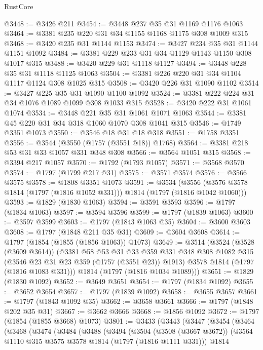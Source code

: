 \begin{lexlean}{RustCore}
\begin{coremodule}
@3448 := @3426 @211
@3454 := @3448 @237 @35 @31 @1169 @1176 @1063
@3464 := @3381 @235 @220 @31 @34 @1155 @1168 @1175 @308 @1009 @315
@3468 := @3420 @235 @31 @1144 @1153
@3474 := @3427 @234 @35 @31 @1144 @1151 @1092
@3484 := @3381 @229 @233 @31 @34 @1129 @1143 @1150 @308 @1017 @315
@3488 := @3420 @229 @31 @1118 @1127
@3494 := @3448 @228 @35 @31 @1118 @1125 @1063
@3504 := @3381 @226 @220 @31 @34 @1104 @1117 @1124 @308 @1025 @315
@3508 := @3420 @226 @31 @1090 @1102
@3514 := @3427 @225 @35 @31 @1090 @1100 @1092
@3524 := @3381 @222 @224 @31 @34 @1076 @1089 @1099 @308 @1033 @315
@3528 := @3420 @222 @31 @1061 @1074
@3534 := @3448 @221 @35 @31 @1061 @1071 @1063
@3544 := @3381 @45 @220 @31 @34 @318 @1060 @1070 @308 @1041 @315
@3546 := @1749 @3351 @1073
@3550 := @3546 @18 @31 @18 @318
@3551 := @1758 @3351
@3556 := @3544 (@3550 (@1757 (@3551 @18)) @1768)
@3564 := @3381 @218 @53 @31 @33 @1057 @331 @348 @308
@3566 := @3564 @1051 @315
@3568 := @3394 @217 @1057
@3570 := @1792 (@1793 @1057)
@3571 := @3568 @3570
@3574 := @1797 (@1799 @217 @31)
@3575 := @3571 @3574
@3576 := @3566 @3575
@3578 := @1808 @3351 @1073
@3591 := @3534
    (@3556 (@3576 @3578 @1814 (@1797 (@1816 @1052 @331))) @1814 (@1797 (@1816 @1042 @1060)))
@3593 := @1829 (@1830 @1063)
@3594 := @3591 @3593
@3596 := @1797 (@1834 @1063)
@3597 := @3594 @3596
@3599 := @1797 (@1839 @1063)
@3600 := @3597 @3599
@3603 := @1797 (@1843 @1063 @35)
@3604 := @3600 @3603
@3608 := @1797 (@1848 @211 @35 @31)
@3609 := @3604 @3608
@3614 := @1797 (@1854 (@1855 (@1856 @1063)) @1073)
@3649 := @3514
    (@3524
      (@3528 (@3609 @3614))
      (@3381
        @58
        @53
        @31
        @33
        @359
        @331
        @348
        @308
        @1082
        @315
        (@3546 @23 @31 @23 @359 (@1757 (@3551 @23)) @1913)
        @3578
        @1814
        (@1797 (@1816 @1083 @331)))
      @1814
      (@1797 (@1816 @1034 @1089)))
@3651 := @1829 (@1830 @1092)
@3652 := @3649 @3651
@3654 := @1797 (@1834 @1092)
@3655 := @3652 @3654
@3657 := @1797 (@1839 @1092)
@3658 := @3655 @3657
@3661 := @1797 (@1843 @1092 @35)
@3662 := @3658 @3661
@3666 := @1797 (@1848 @202 @35 @31)
@3667 := @3662 @3666
@3668 := @1856 @1092
@3672 := @1797 (@1854 (@1855 @3668) @1073)
@3801 := @3433
    (@3443
      (@3447
        (@3454
          (@3464
            (@3468
              (@3474
                (@3484
                  (@3488
                    (@3494
                      (@3504
                        (@3508 (@3667 @3672))
                        (@3564 @1110 @315 @3575 @3578 @1814 (@1797 (@1816 @1111 @331)))
                        @1814

\end{coremodule}
\end{lexlean}

